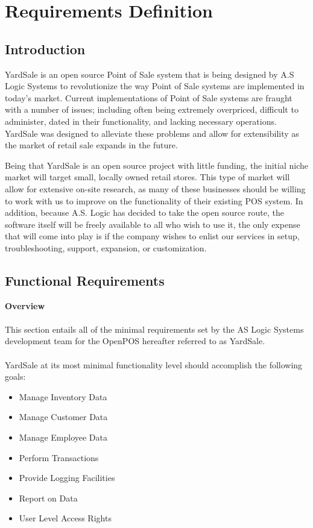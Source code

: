 \documentclass{report}
\title{}
\author{}
\begin{document}
\chapter{Requirements Definition}

\section{Introduction}

YardSale is an open source Point of Sale system that is being designed by A.S Logic Systems to revolutionize the way Point of Sale systems are implemented in today's market.  Current implementations of Point of Sale systems are fraught with a number of issues; including often being extremely overpriced, difficult to administer, dated in their functionality, and lacking necessary operations.  YardSale was designed to alleviate these problems and allow for extensibility as the market of retail sale expands in the future.

Being that YardSale is an open source project with little funding, the initial niche market will target small, locally owned retail stores.  This type of market will allow for extensive on-site research, as many of these businesses should be willing to work with us to improve on the functionality of their existing POS system.  In addition, because A.S. Logic has decided to take the open source route, the software itself will be freely available to all who wish to use it, the only expense that will come into play is if the company wishes to enlist our services in setup, troubleshooting, support, expansion, or customization.

\section{Functional Requirements}

\textbf{Overview}\\
\\
This section entails all of the minimal requirements set by the AS Logic Systems development team for the OpenPOS hereafter referred to as YardSale.\\
\\
YardSale at its most minimal functionality level should accomplish the following goals:

\begin{itemize}
	\item {Manage Inventory Data}
	\item {Manage Customer Data}
	\item {Manage Employee Data}
	\item {Perform Transactions}
	\item {Provide Logging Facilities}
	\item {Report on Data}
	\item {User Level Access Rights}
\end{itemize}
\end{document}
